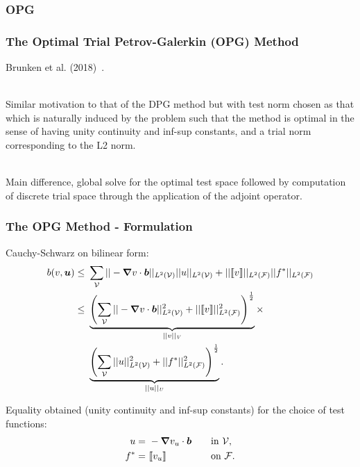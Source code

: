 \subsubsection{OPG}

\begin{frame}
\frametitle{The Optimal Trial Petrov-Galerkin (OPG) Method}

Brunken et al. (2018)~\cite{Demkowicz2011}.
\\~

Similar motivation to that of the DPG method but with test norm
chosen as that which is naturally induced by the problem such that the method is
optimal in the sense of having unity continuity and inf-sup constants, and a
trial norm corresponding to the L2 norm.
\\~

Main difference, global solve for the optimal test space followed by computation
of discrete trial space through the application of the adjoint operator.

\end{frame}

\begin{frame}
\frametitle{The OPG Method - Formulation}

Cauchy-Schwarz on bilinear form:
\begin{align} \label{eq:cauchy_scwarz_advection}
b(v,\varg{u})
\le\ & \sum_{\fe{V}}
|| - \nabla v \cdot \varv{b} ||_{L^2(\fe{V})} || u ||_{L^2(\fe{V})}
+
||\jump{v}||_{L^2(\fe{F})} ||f^*||_{L^2(\fe{F})} \\
\le\ &
\underbrace{\left(
\sum_{\fe{V}} || - \nabla v \cdot \varv{b} ||^2_{L^2(\fe{V})} + ||\jump{v}||^2_{L^2(\fe{F})}
\right)^\frac{1}{2}}_{||v||_\fspace{V}}
       \times \\
  &
\underbrace{\left(
\sum_{\fe{V}} || u ||^2_{L^2(\fe{V})} + ||f^*||^2_{L^2(\fe{F})}
\right)^\frac{1}{2}}_{||u||_\fspace{U}}.
\end{align}

Equality obtained (unity continuity and inf-sup constants) for the choice of
test functions:
\begin{alignat}{3}
u =\ & -\nabla v_u \cdot \vect{b}\quad && \text{in}\ \fe{V}, \\
f^* =\ & \jump{v_u} && \text{on}\ \fe{F}.
\end{alignat}

\end{frame}

